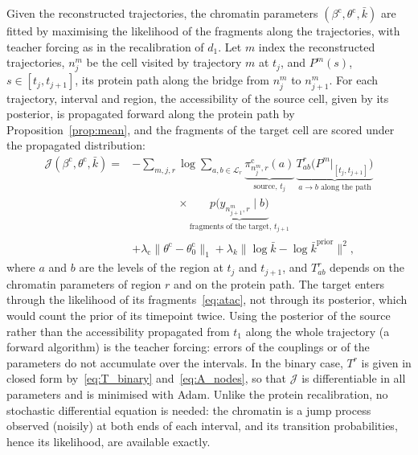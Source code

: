 \documentclass[a4paper, 11pt]{article}
\newcommand{\thc}{\theta^{\mathrm{c}}}
\newcommand{\bc}{\beta^{\mathrm{c}}}
\newcommand{\Lv}{\mathcal{L}}
\theoremstyle{plain}
\theoremstyle{remark}
\begin{document}
Given the reconstructed trajectories, the chromatin parameters $(\bc, \thc, \bar k)$ are fitted by maximising the likelihood of the fragments along the trajectories, with teacher forcing as in the recalibration of $d_1$. Let $m$ index the reconstructed trajectories, $n^m_j$ be the cell visited by trajectory $m$ at $t_j$, and $P^m(s)$, $s \in [t_j, t_{j+1}]$, its protein path along the bridge from $n^m_j$ to $n^m_{j+1}$. For each trajectory, interval and region, the accessibility of the source cell, given by its posterior, is propagated forward along the protein path by Proposition~\ref{prop:mean}, and the fragments of the target cell are scored under the propagated distribution:
\begin{equation}\label{eq:chromfit}
\begin{split}
\mathcal{J}(\bc, \thc, \bar k) = {} & -\sum_{m,j,r} \log \sum_{a, b \in \Lv_r} \underbrace{\pi^{\mathrm{c}}_{n^m_j, r}(a)}_{\text{source, } t_j}\, \underbrace{T^r_{ab}\bigl(P^m|_{[t_j,t_{j+1}]}\bigr)}_{a \to b \text{ along the path}} \\
& \qquad\qquad \times \underbrace{p\bigl(y_{n^m_{j+1}, r} \mid b\bigr)}_{\text{fragments of the target, } t_{j+1}} \\
& + \lambda_{\mathrm c}\|\thc - \thc_0\|_1 + \lambda_{k}\|\log\bar k - \log\bar k^{\mathrm{prior}}\|^2 ,
\end{split}
\end{equation}
where $a$ and $b$ are the levels of the region at $t_j$ and $t_{j+1}$, and $T^r_{ab}$ depends on the chromatin parameters of region $r$ and on the protein path. The target enters through the likelihood of its fragments~\eqref{eq:atac}, not through its posterior, which would count the prior of its timepoint twice. Using the posterior of the source rather than the accessibility propagated from $t_1$ along the whole trajectory (a forward algorithm) is the teacher forcing: errors of the couplings or of the parameters do not accumulate over the intervals.
In the binary case, $T^r$ is given in closed form by~\eqref{eq:T_binary} and~\eqref{eq:A_nodes}, so that $\mathcal{J}$ is differentiable in all parameters and is minimised with Adam. Unlike the protein recalibration, no stochastic differential equation is needed: the chromatin is a jump process observed (noisily) at both ends of each interval, and its transition probabilities, hence its likelihood, are available exactly.
\end{document}
